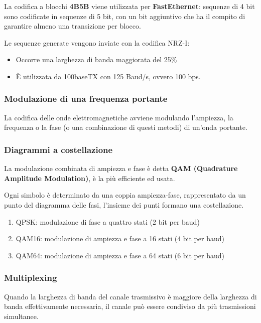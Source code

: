             La codifica a blocchi \textbf{4B5B} viene utilizzata per \textbf{FastEthernet}: sequenze di 4 bit sono codificate in sequenze di 5 bit, con un bit aggiuntivo che ha il compito di garantire almeno una transizione per blocco.

            Le sequenze generate vengono inviate con la codifica NRZ-I:
            \begin{itemize}
                \item Occorre una larghezza di banda maggiorata del 25\%
                \item È utilizzata da 100baseTX con 125 Baud/s, ovvero 100 bps.
            \end{itemize}

        \subsubsection{Modulazione di una frequenza portante}
            La codifica delle onde elettromagnetiche avviene modulando l'ampiezza, la frequenza o la fase (o una combinazione di questi metodi) di un'onda portante.

            

        \subsubsection{Diagrammi a costellazione}
            La modulazione combinata di ampiezza e fase è detta \textbf{QAM (Quadrature Amplitude Modulation)}, è la più efficiente ed usata.

            Ogni simbolo è determinato da una coppia ampiezza-fase, rappresentato da un punto del diagramma delle fasi, l'insieme dei punti formano una costellazione.

            \begin{enumerate}[label=(\alph*)]
                \item QPSK: modulazione di fase a quattro stati (2 bit per baud)
                \item QAM16: modulazione di ampiezza e fase a 16 stati (4 bit per baud)
                \item QAM64: modulazione di ampiezza e fase a 64 stati (6 bit per baud)
            \end{enumerate}

            

        \subsubsection{Multiplexing}
            Quando la larghezza di banda del canale trasmissivo è maggiore della larghezza di banda effettivamente necessaria, il canale può essere condiviso da più trasmissioni simultanee.

